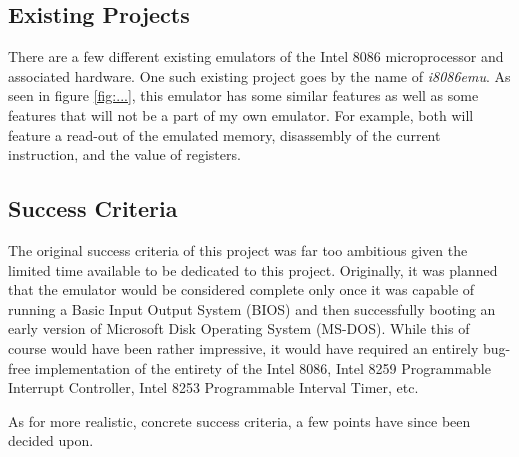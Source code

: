 \subsection{Existing Projects}
    There are a few different existing emulators of the Intel 8086 microprocessor and associated hardware. One such existing project goes by the name of \textit{i8086emu}. As seen in figure \ref{fig:...}, this emulator has some similar features as well as some features that will not be a part of my own emulator. For example, both will feature a read-out of the emulated memory, disassembly of the current instruction, and the value of registers.

\subsection{Success Criteria}
    The original success criteria of this project was far too ambitious given the limited time available to be dedicated to this project. Originally, it was planned that the emulator would be considered complete only once it was capable of running a Basic Input Output System (BIOS) and then successfully booting an early version of Microsoft Disk Operating System (MS-DOS). While this of course would have been rather impressive, it would have required an entirely bug-free implementation of the entirety of the Intel 8086, Intel 8259 Programmable Interrupt Controller, Intel 8253 Programmable Interval Timer, etc.

    As for more realistic, concrete success criteria, a few points have since been decided upon.